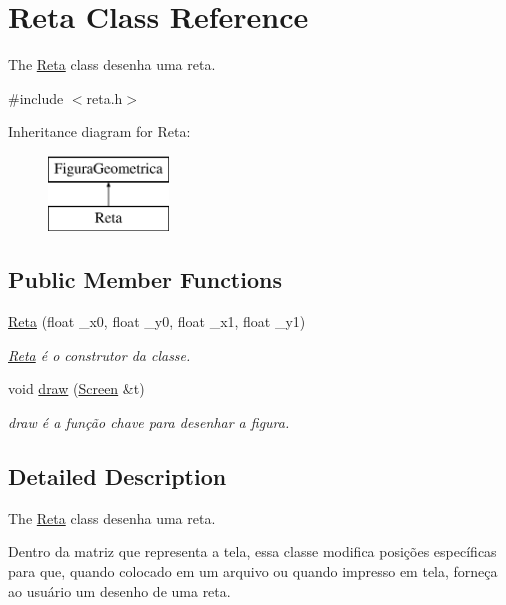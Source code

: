 \hypertarget{class_reta}{}\section{Reta Class Reference}
\label{class_reta}


The \mbox{\hyperlink{class_reta}{Reta}} class desenha uma reta.  




{\ttfamily \#include $<$reta.\+h$>$}

Inheritance diagram for Reta\+:\begin{figure}[H]
\begin{center}
\leavevmode
\includegraphics[height=2.000000cm]{class_reta}
\end{center}
\end{figure}
\subsection*{Public Member Functions}
\begin{DoxyCompactItemize}
\item 
\mbox{\hyperlink{class_reta_a9cde511ceb1d4e6638aaf735dfc24a7c}{Reta}} (float \+\_\+x0, float \+\_\+y0, float \+\_\+x1, float \+\_\+y1)
\begin{DoxyCompactList}\small\item\em \mbox{\hyperlink{class_reta}{Reta}} é o construtor da classe. \end{DoxyCompactList}\item 
void \mbox{\hyperlink{class_reta_ac2e9805183cd474b62bffd8b032cd780}{draw}} (\mbox{\hyperlink{class_screen}{Screen}} \&t)
\begin{DoxyCompactList}\small\item\em draw é a função chave para desenhar a figura. \end{DoxyCompactList}\end{DoxyCompactItemize}


\subsection{Detailed Description}
The \mbox{\hyperlink{class_reta}{Reta}} class desenha uma reta. 

Dentro da matriz que representa a tela, essa classe modifica posições específicas para que, quando colocado em um arquivo ou quando impresso em tela, forneça ao usuário um desenho de uma reta. 

